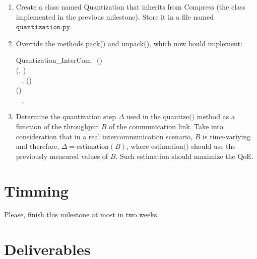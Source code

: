\begin{enumerate}
\item Create a class named $\text{Quantization}$ that inherits from
  $\text{Compress}$ (the class implemented in the previous
  milestone). Store it in a file named $\mathtt{quantization.py}$.
  
\item Override the methods $\text{pack}$() and $\text{unpack}$(),
  which now hould implement:

\begin{pseudocode}{Quantization\_InterCom}{~}
  \BEGIN
     \GETS {}()\\
     \GETS {}(, )\\
    ~ 
  \END
  \ENDPROCEDURE
  \BEGIN
    ,  \GETS {}()\\
     \GETS {}()\\
    ~ , 
  \END
  \ENDPROCEDURE
\end{pseudocode}

\item Determine the quantization step $\Delta$ used in the
  $\text{quantize()}$ method as a function of the
  \href{https://en.wikipedia.org/wiki/Throughput}{throughput} $B$ of
  the communication link. Take into consideration that in a real
  intercommunication scenario, $B$ is time-variying and therefore,
  $\Delta = \text{estimation}(B)$, where $\text{estimation()}$
  should use the previously measured values of $B$. Such estimation
  should maximize the QoE.
\end{enumerate}

\section{Timming}

Please, finish this milestone at most in two weeks.

\section{Deliverables}

